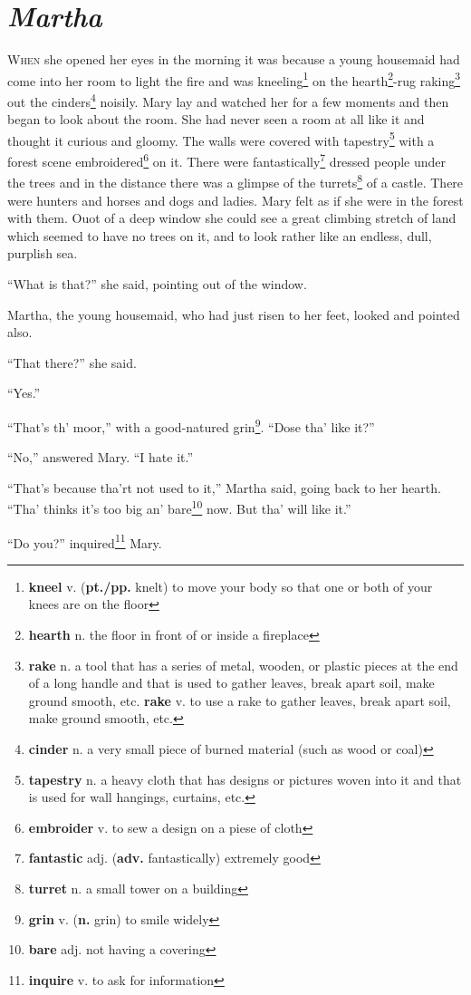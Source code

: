 \chapter{\textit{Martha}}
\lettrine{W}{hen} she opened her eyes in the morning it was because a young housemaid had come into her room to light the fire and was kneeling\footnote{\textbf{kneel} v. (\textbf{pt./pp.} knelt) to move your body so that one or both of your knees are on the floor} on the hearth\footnote{\textbf{hearth} n. the floor in front of or inside a fireplace}-rug raking\footnote{\textbf{rake} n. a tool that has a series of metal, wooden, or plastic pieces at the end of a long handle and that is used to gather leaves, break apart soil, make ground smooth, etc. \textbf{rake} v. to use a rake to gather leaves, break apart soil, make ground smooth, etc.} out the cinders\footnote{\textbf{cinder} n. a very small piece of burned material (such as wood or coal)} noisily. Mary lay and watched her for a few moments and then began to look about the room. She had never seen a room at all like it and thought it curious and gloomy. The walls were covered with tapestry\footnote{\textbf{tapestry} n. a heavy cloth that has designs or pictures woven into it and that is used for wall hangings, curtains, etc.} with a forest scene embroidered\footnote{\textbf{embroider} v. to sew a design on a piese of cloth} on it. There were fantastically\footnote{\textbf{fantastic} adj. (\textbf{adv.} fantastically) extremely good} dressed people under the trees and in the distance there was a glimpse of the turrets\footnote{\textbf{turret} n. a small tower on a building} of a castle. There were hunters and horses and dogs and ladies. Mary felt as if she were in the forest with them. Ouot of a deep window she could see a great climbing stretch of land which seemed to have no trees on it, and to look rather like an endless, dull, purplish sea.

``What is that?'' she said, pointing out of the window.

Martha, the young housemaid, who had just risen to her feet, looked and pointed also.

``That there?'' she said.

``Yes.''

``That's th' moor,'' with a good-natured grin\footnote{\textbf{grin} v. (\textbf{n.} grin) to smile widely}. ``Dose tha' like it?''

``No,'' answered Mary. ``I hate it.''

``That's because tha'rt not used to it,'' Martha said, going back to her hearth. ``Tha' thinks it's too big an' bare\footnote{\textbf{bare} adj. not having a covering} now. But tha' will like it.''

``Do you?'' inquired\footnote{\textbf{inquire} v. to ask for information} Mary.
